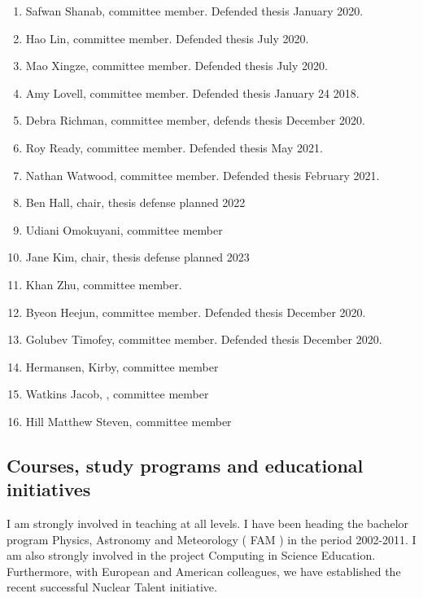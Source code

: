 \documentclass[%
oneside,                 %
final,                   %
10pt]{article}
\begin{document}
\begin{enumerate}
\item Safwan Shanab, committee member. Defended thesis January 2020.

\item Hao Lin, committee member. Defended thesis July 2020.

\item Mao Xingze, committee member. Defended thesis July 2020.

\item Amy Lovell, committee member. Defended thesis January 24 2018.

\item Debra Richman, committee member, defends thesis December 2020.

\item Roy Ready, committee member. Defended thesis May 2021.

\item Nathan Watwood, committee member. Defended thesis February 2021. 

\item Ben Hall, chair, thesis defense planned 2022

\item Udiani Omokuyani, committee member

\item Jane Kim, chair, thesis defense planned 2023

\item Khan Zhu, committee member. 

\item Byeon Heejun, committee member. Defended thesis December 2020.

\item Golubev Timofey, committee member. Defended thesis December 2020.

\item Hermansen, Kirby, committee member

\item Watkins Jacob, , committee member

\item Hill Matthew Steven, committee member
\end{enumerate}

\noindent
\subsection{Courses, study programs and educational initiatives}

I am strongly involved in teaching at all levels. I have been heading
the bachelor program Physics, Astronomy and Meteorology ( FAM ) in the
period 2002-2011. I am also strongly involved in the project Computing
in Science Education. Furthermore, with European and American
colleagues, we have established the recent successful Nuclear Talent
initiative.
\end{document}
